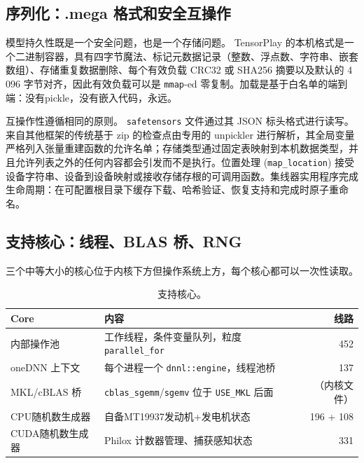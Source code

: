 \subsection{序列化：.mega 格式和安全互操作}
\label{subsec:eval-serialization}

模型持久性既是一个安全问题，也是一个存储问题。 TensorPlay 的本机格式是一个二进制容器，具有四字节魔法、标记元数据记录（整数、浮点数、字符串、嵌套数组）、存储重复数据删除、每个有效负载 CRC32 或 SHA256 摘要以及默认的 4\,096 字节对齐，因此有效负载可以是 \texttt{mmap}-ed 零复制。加载是基于白名单的端到端：没有pickle，没有嵌入代码，永远。

互操作性遵循相同的原则。 \texttt{safetensors} 文件通过其 JSON 标头格式进行读写。来自其他框架的传统基于 zip 的检查点由专用的 unpickler 进行解析，其全局变量严格列入张量重建函数的允许名单；存储类型通过固定表映射到本机数据类型，并且允许列表之外的任何内容都会引发而不是执行。位置处理 (\texttt{map\_location}) 接受设备字符串、设备到设备映射或接收存储存根的可调用函数。集线器实用程序完成生命周期：在可配置根目录下缓存下载、哈希验证、恢复支持和完成时原子重命名。



\subsection{支持核心：线程、BLAS 桥、RNG}
\label{subsec:eval-supportcores}

三个中等大小的核心位于内核下方但操作系统上方，每个核心都可以一次性读取。

\begin{table}[H]
\centering
\caption{支持核心。}
\label{tab:supportcores}
\small
\begin{tabular}{llr}
\toprule
Core & 内容 & 线路 \\
\midrule
内部操作池 & 工作线程，条件变量队列，粒度 \texttt{parallel\_for} & 452 \\
oneDNN 上下文 & 每个进程一个 \texttt{dnnl::engine}，线程池桥 & 137 \\
MKL/cBLAS 桥 & \texttt{cblas\_sgemm}/\texttt{sgemv} 位于 \texttt{USE\_MKL} 后面 & （内核文件） \\
CPU随机数生成器 & 自备MT19937发动机+发电机状态 & 196 + 108 \\
CUDA随机数生成器 & Philox 计数器管理、捕获感知状态 & 331 \\
\bottomrule
\end{tabular}
\end{table}


